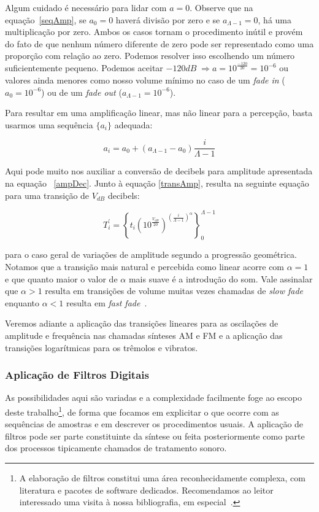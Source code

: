 Algum cuidado é necessário para lidar com $a=0$. Observe que
na equação~\ref{seqAmp}, se $a_0=0$ haverá divisão por zero e
se $a_{\Lambda-1}=0$, há uma multiplicação por zero. Ambos os casos
tornam o procedimento inútil e provém do fato de que nenhum número diferente de zero pode ser representado como uma proporção com relação ao zero. Podemos resolver isso escolhendo um número suficientemente pequeno. Podemos aceitar $-120dB\;\Rightarrow a=10^{\frac{-120}{20}}=10^{-6}$ ou valores ainda menores como nosso volume mínimo no caso de um
\emph{fade in} ($a_0=10^{-6}$) ou de um \emph{fade out} ($a_{\Lambda-1}=10^{-6}$).


Para resultar em uma amplificação linear, mas não linear para a percepção, basta usarmos uma sequência $\{a_i\}$ adequada:

\begin{equation}
a_i=a_0 + (a_{\Lambda-1}-a_0)\frac{i}{\Lambda-1}
\end{equation}

Aqui pode muito nos auxiliar a conversão de decibels para amplitude apresentada na equação ~\ref{ampDec}.
Junto à equação \ref{transAmp}, resulta na seguinte equação para uma transição de $V_{dB}$ decibels:

\begin{equation}
T_i^{'}=\left \{ t_i (10^{\frac{V_{dB}}{20}} )^{\left ( \frac{i}{\Lambda-1} \right )^\alpha} \right \}_0^{\Lambda-1}
\end{equation}

para o caso geral de variações de amplitude segundo a progressão geométrica. Notamos que a transição mais natural e percebida como linear acorre com $\alpha=1$ e que quanto maior o valor de $\alpha$ mais suave é a introdução do som. Vale assinalar que $\alpha>1$ resulta em transições de volume muitas vezes chamadas de \emph{slow fade} enquanto $\alpha<1$ resulta em \emph{fast fade}~\cite{fades}.

Veremos adiante a aplicação das transições lineares para as oscilações 
de amplitude e frequência nas chamadas sínteses AM e FM e a aplicação das transições
logarítmicas para os trêmolos e vibratos.

\subsubsection{Aplicação de Filtros Digitais}
 As possibilidades
aqui são variadas e a complexidade facilmente
foge ao escopo deste trabalho\footnote{A elaboração de filtros
constitui uma área reconhecidamente complexa, com literatura
e pacotes de software dedicados. 
Recomendamos ao leitor
interessado uma visita à nossa bibliografia, em especial~\cite{Openheim,smith}.},
de forma que focamos em explicitar o que ocorre com as sequências
de amostras e em descrever os procedimentos usuais.
A aplicação de filtros pode
ser parte constituinte da síntese ou feita posteriormente
como parte dos processos tipicamente chamados de tratamento sonoro.

